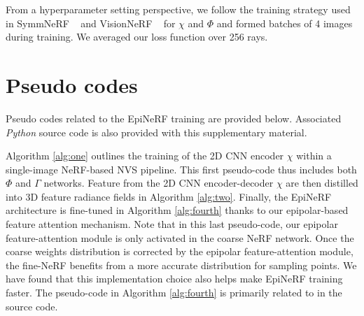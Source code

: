 From a hyperparameter setting perspective, we follow the training strategy used in  SymmNeRF ~\cite{li2022symmnerf} and VisionNeRF ~\cite{lin2023vision} for $\chi$ and $\Phi$ and formed batches of 4 images during training. We averaged our loss function over 256 rays.

\section{Pseudo codes}

Pseudo codes related to the EpiNeRF training are provided below. Associated \textit{Python} source code is also provided with this supplementary material. 

Algorithm \ref{alg:one} outlines the training of the 2D CNN encoder $\chi$ within a single-image NeRF-based NVS pipeline. This first pseudo-code thus includes both $\Phi$ and $\Gamma$ networks. Feature from the 2D CNN encoder-decoder $\chi$ are then distilled into 3D feature radiance fields in Algorithm \ref{alg:two}. Finally, the EpiNeRF architecture is fine-tuned in Algorithm \ref{alg:fourth} thanks to our epipolar-based feature attention mechanism. Note that in this last pseudo-code, our epipolar feature-attention module is only activated in the coarse NeRF network. Once the coarse weights distribution is corrected by the epipolar feature-attention module, the fine-NeRF benefits from a more accurate distribution for sampling points. We have found that this implementation choice also helps make EpiNeRF training faster. The pseudo-code in Algorithm \ref{alg:fourth} is primarily related to  in the source code.


